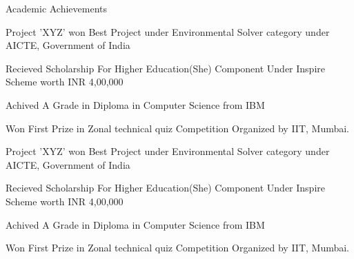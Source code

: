 \documentclass{resume}
\begin{document}
\begin{rSection}{Academic Achievements} 
\item Project 'XYZ' won Best Project under Environmental Solver category under AICTE, Government of India
\item Recieved Scholarship For Higher Education(She) Component Under Inspire Scheme worth INR 4,00,000
\item Achived A Grade in Diploma in Computer Science from IBM
\item Won First Prize in Zonal technical quiz Competition Organized by IIT, Mumbai.
\item Project 'XYZ' won Best Project under Environmental Solver category under AICTE, Government of India
\item Recieved Scholarship For Higher Education(She) Component Under Inspire Scheme worth INR 4,00,000
\item Achived A Grade in Diploma in Computer Science from IBM
\item Won First Prize in Zonal technical quiz Competition Organized by IIT, Mumbai.
\end{rSection}
\end{document}
